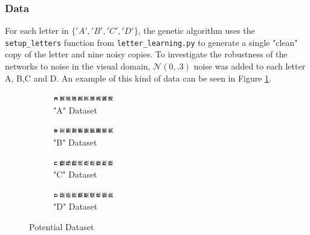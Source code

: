 \documentclass[12pt,a4paper]{article}
\begin{document}
\subsubsection{Data}
For each letter in $\lbrace 'A', 'B', 'C', 'D' \rbrace$, the genetic algorithm uses the \texttt{setup\_letters} function from \texttt{letter\_learning.py} to generate a single "clean" copy of the letter and nine noisy copies. To investigate the robustness of the networks to noise in the visual domain, $\mathcal{N}(0,.3)$ noise was added to each letter A, B,C and D. An example of this kind of data can be seen in Figure \ref{fig:noisydataset}. 
\begin{figure}[H]
\centering
\begin{subfigure}{1.0\textwidth}
  \centering
  \includegraphics[width=1.0\linewidth]{tile_A.png}
  \caption{"A" Dataset}
\end{subfigure}

\begin{subfigure}{1.0\textwidth}
  \centering
  \includegraphics[width=1.0\linewidth]{tile_B.png}
  \caption{"B" Dataset}
\end{subfigure}

\begin{subfigure}{1.0\textwidth}
  \centering
  \includegraphics[width=1.0\linewidth]{tile_C.png}
  \caption{"C" Dataset}
\end{subfigure}

\begin{subfigure}{1.0\textwidth}
  \centering
  \includegraphics[width=1.0\linewidth]{tile_D.png}
  \caption{"D" Dataset}
\end{subfigure}%

\caption{Potential Dataset}
\label{fig:noisydataset}
\end{figure}
 
\end{document}
